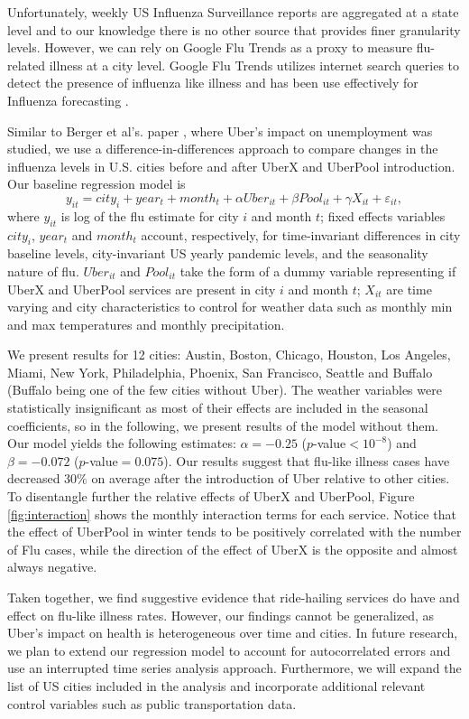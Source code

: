 \documentclass[a4paper,12pt]{article}
\begin{document}
Unfortunately, weekly US Influenza Surveillance reports are aggregated at a state level and to our knowledge there is no other source that provides finer granularity levels. However, we can rely on Google Flu Trends as a proxy to measure flu-related illness at a city level. Google Flu Trends utilizes internet search queries to detect the presence of influenza like illness and has been use effectively for Influenza forecasting \cite{yang2015accurate}.

Similar to Berger et al's. paper \cite{berger2017drivers}, where Uber's impact on unemployment was studied, we use a difference-in-differences approach to compare changes in the influenza levels in U.S. cities before and after UberX and UberPool introduction. Our baseline regression model is
\[
y_{it}=city_{i}+year_{t}+month_{t}+\alpha Uber_{it}+\beta Pool_{it}+\gamma X_{it}+ \varepsilon_{it},
\]
where $y_{it}$ is log of the flu estimate for city $i$ and month $t$; fixed effects variables $city_{i}$, $year_{t}$ and $month_{t}$ account, respectively, for time-invariant differences in city baseline levels, city-invariant US yearly pandemic levels, and the seasonality nature of flu. $Uber_{it}$ and $ Pool_{it}$ take the form of a dummy variable representing if UberX and UberPool services are present in city $i$ and month $t$; $X_{it}$ are time varying and city characteristics to control for weather data such as monthly min and max temperatures and monthly precipitation.

We present results for 12 cities: Austin, Boston, Chicago, Houston, Los Angeles, Miami, New York, Philadelphia, Phoenix,  San Francisco, Seattle and Buffalo (Buffalo being one of the few cities without Uber). The weather variables were statistically insignificant as most of their effects are included in the seasonal coefficients, so in the following, we present results of the model without them.
Our model yields the following estimates:  $\alpha =-0.25$ ($p$-value$<10^{-8}$) and $\beta =-0.072$ ($p$-value$=0.075$). Our results suggest that flu-like illness cases have decreased $30\%$ on average after the introduction of Uber relative to other cities. To disentangle further the relative effects of UberX and UberPool, Figure \ref{fig:interaction} shows the monthly interaction terms for each service. Notice  that the effect of UberPool in winter tends to be positively correlated with the number of Flu cases,  while the direction of the effect of UberX is the opposite and almost always negative.

Taken together, we find suggestive evidence that ride-hailing services do have and effect on flu-like illness rates. However, our findings cannot be generalized, as Uber's impact on health is heterogeneous over time and cities. In future research, we plan to extend our regression model to account for autocorrelated errors and use an interrupted time series analysis approach. Furthermore, we will expand the list of US cities included in the analysis and incorporate additional relevant control variables such as public transportation data.
\end{document}

